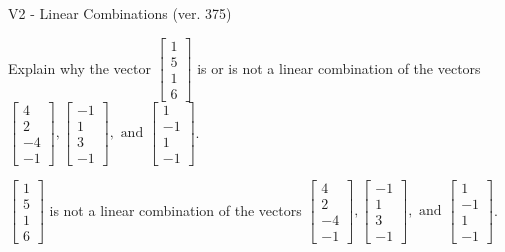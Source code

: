 \begin{exercise}
  \begin{exerciseTitle}V2 - Linear Combinations (ver. 375)\end{exerciseTitle}
  \begin{exerciseStatement}
    Explain why the vector \(\left[\begin{array}{c}
1 \\
5 \\
1 \\
6
\end{array}\right]\)  is or is not a linear 
	combination of the vectors \(\left[\begin{array}{c}
4 \\
2 \\
-4 \\
-1
\end{array}\right] , \left[\begin{array}{c}
-1 \\
1 \\
3 \\
-1
\end{array}\right] , \text{ and } \left[\begin{array}{c}
1 \\
-1 \\
1 \\
-1
\end{array}\right]\).
	


  \end{exerciseStatement}
  \begin{exerciseAnswer}
   \(\left[\begin{array}{c}
1 \\
5 \\
1 \\
6
\end{array}\right]\) 
  	 is not  
	a linear combination of the vectors \(\left[\begin{array}{c}
4 \\
2 \\
-4 \\
-1
\end{array}\right] , \left[\begin{array}{c}
-1 \\
1 \\
3 \\
-1
\end{array}\right] , \text{ and } \left[\begin{array}{c}
1 \\
-1 \\
1 \\
-1
\end{array}\right]\).

	
  


  \end{exerciseAnswer}
\end{exercise}
